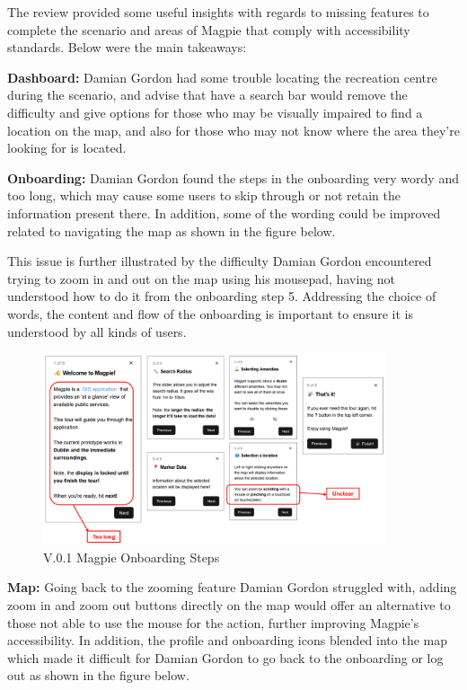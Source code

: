 The review provided some useful insights with regards to missing
features to complete the scenario and areas of Magpie that comply with
accessibility standards. Below were the main takeaways:

\textbf{Dashboard: }
Damian Gordon had some trouble locating the recreation centre during the
scenario, and advise that have a search bar would remove the difficulty and give
options for those who may be visually impaired to find a location on the map,
and also for those who may not know where the area they're looking for is
located.

\textbf{Onboarding: }
Damian Gordon found the steps in the onboarding very wordy and too long, which
may cause some users to skip through or not retain the information present
there. In addition, some of the wording could be improved related to navigating
the map as shown in the figure below.

\newpage{}

This issue is further illustrated by the difficulty Damian Gordon encountered
trying to zoom in and out on the map using his mousepad, having not understood
how to do it from the onboarding step 5. Addressing the choice of words, the
content and flow of the onboarding is important to ensure it is understood by
all kinds of users.

\begin{figure}[h!]
    \centering
    \includegraphics[width=0.9\textwidth]{images/onboarding-text-v1.png}
    \caption{V.0.1 Magpie Onboarding Steps}
\end{figure}

\textbf{Map: }
Going back to the zooming feature Damian Gordon struggled with, adding zoom in
and zoom out buttons directly on the map would offer an alternative to those not
able to use the mouse for the action, further improving Magpie's accessibility.
In addition, the profile and onboarding icons blended into the map which made it
difficult for Damian Gordon to go back to the onboarding or log out as shown in
the figure below.

